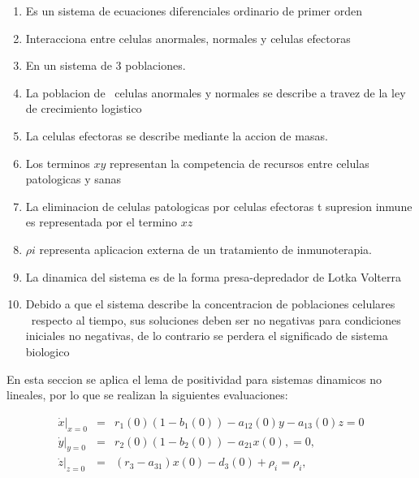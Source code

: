 \documentclass[letterpaper,11pt]{article}
\begin{document}
\begin{enumerate}
\item Es un sistema de ecuaciones diferenciales ordinario de primer orden

\item Interacciona entre celulas anormales, normales y celulas efectoras

\item En un sistema de 3 poblaciones.

\item La poblacion de \ celulas anormales y normales se describe a travez de
la ley de crecimiento logistico

\item La celulas efectoras se describe mediante la accion de masas.

\item Los terminos $xy$ representan la competencia de recursos entre celulas
patologicas y sanas

\item La eliminacion de celulas patologicas por celulas efectoras t
supresion inmune es representada por el termino $xz$

\item $\rho i$ representa aplicacion externa de un tratamiento de
inmunoterapia.

\item La dinamica del sistema es de la forma presa-depredador de Lotka
Volterra

\item Debido a que el sistema describe la concentracion de poblaciones
celulares \ respecto al tiempo, sus soluciones deben ser no negativas para
condiciones iniciales no negativas, de lo contrario se perdera el
significado de sistema biologico
\end{enumerate}

\bigskip

\bigskip En esta seccion se aplica el lema de positividad para sistemas
dinamicos no lineales, por lo que se realizan la siguientes evaluaciones:

\begin{eqnarray*}
\left. \dot{x}\right\vert _{x=0} &=&r_{1}\left( 0\right) \left(
1-b_{1}\left( 0\right) \right) -a_{12}\left( 0\right) y-a_{13}\left(
0\right) z=0 \\
\left. \dot{y}\right\vert _{y=0} &=&r_{2}\left( 0\right) \left(
1-b_{2}\left( 0\right) \right) -a_{21}x\left( 0\right) ,=0, \\
\left. \dot{z}\right\vert _{z=0} &=&\left( r_{3}-a_{31}\right) x\left(
0\right) -d_{3}\left( 0\right) +\rho _{i}=\rho _{i},
\end{eqnarray*}
\end{document}
